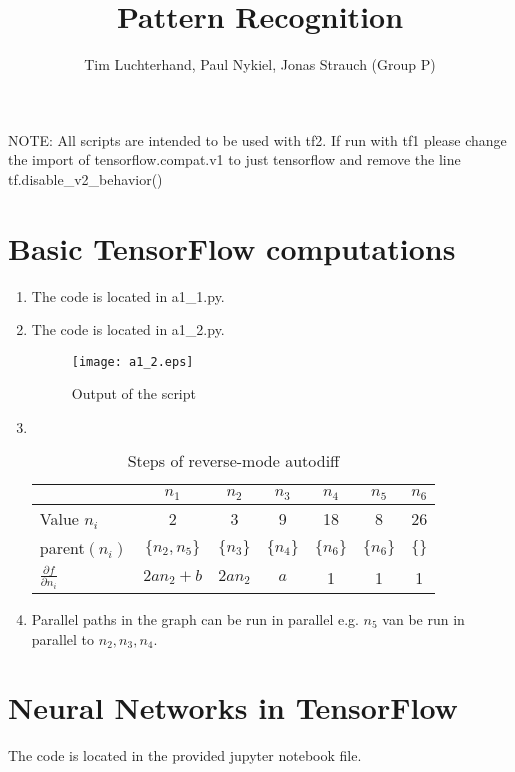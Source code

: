 \documentclass[DIN, pagenumber=false, fontsize=11pt, parskip=half]{scrartcl}
\title{Pattern Recognition}
\author{Tim Luchterhand, Paul Nykiel, Jonas Strauch (Group P)}
\begin{document}
    \maketitle
    NOTE: All scripts are intended to be used with tf2. If run with tf1 please change the import of tensorflow.compat.v1 to just tensorflow
    and remove the line tf.disable\_v2\_behavior()
    \section{Basic TensorFlow computations}
    \begin{enumerate}
        \item
            The code is located in a1\_1.py.
        \item
            The code is located in a1\_2.py.
            \begin{figure}[H]
                \centering
                \texttt{[image: a1\_2.eps]}
                \caption{Output of the script}
            \end{figure}
        \item
            $ $
            \begin{table}[H]
                \centering
                \begin{tabular}{lcccccc}
                    \toprule
                    & $n_1$ & $n_2$ & $n_3$ & $n_4$ & $n_5$ & $n_6$ \\
                    \midrule
                    Value $n_i$ & 2 & 3 & 9 & 18 & 8 & 26\\
                    parent$(n_i)$ & $\{n_2, n_5\}$ & $\{n_3\}$ & $\{n_4\}$ & $\{n_6\}$ & $\{n_6\}$ & $\{\}$ \\
                    $\frac{\partial f}{\partial n_i}$& $2 a n_2 + b$& $2 a n_2$ & $a$ & 1 & 1 & 1\\
                    \bottomrule
                \end{tabular}
                \caption{Steps of reverse-mode autodiff}
            \end{table}
        \item
            Parallel paths in the graph can be run in parallel e.g. $n_5$ van be run in parallel to $n_2, n_3, n_4$.
    \end{enumerate}
    \section{Neural Networks in TensorFlow}
    The code is located in the provided jupyter notebook file.
\end{document}
